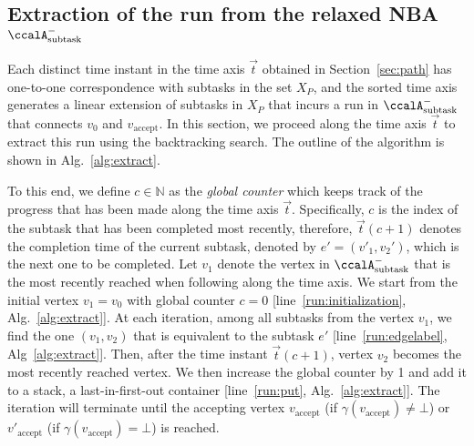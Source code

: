 \documentclass[Afour,sageh,times]{sagej}
\newcommand{\auto}[1]{\ccalA_{\text{#1}}}
\begin{document}
{\subsection{Extraction of the run from the relaxed NBA \upshape $\auto{subtask}^-$}\label{sec:run}

Each distinct time instant in the time axis $\vec{t}$ obtained in Section~\ref{sec:path} has one-to-one correspondence with subtasks in the set $X_P$, and the sorted time axis generates a linear extension of subtasks in $X_P$ that incurs a run in $\auto{subtask}^-$ that connects $v_{0}$ and $v_{\text{accept}}$. In this section, we proceed along the time axis $\vec{t}$ to extract this run using the backtracking search. The outline of the algorithm is shown in Alg.~\ref{alg:extract}.

  To this end, we define $c\in \mathbb{N}$ as the {\it global counter} which keeps track of the progress that has been made along the time axis $\vec{t}$. Specifically, $c$ is the index of the subtask that  has  been completed most recently, therefore, $\vec{t}(c+1)$ denotes  the  completion time of the current subtask, denoted by $e' = (v'_1, v_2')$, which is  the next one to be completed. Let $v_1$ denote the vertex in $\auto{subtask}^-$ that is the  most recently reached when following along the time axis.  We start from the initial vertex $v_1= v_0$ with global counter $c=0$ [line~\ref{run:initialization}, Alg.~\ref{alg:extract}]. At each iteration, among all subtasks from the vertex $v_1$, we find the one $(v_1, v_2)$ that is  equivalent to the  subtask $e'$ [line~\ref{run:edgelabel}, Alg~\ref{alg:extract}]. Then, after the time instant $\vec{t}(c+1)$,  vertex $v_2$ becomes the most recently reached vertex. We then increase the global counter by 1 and add it to a stack, a last-in-first-out container [line~\ref{run:put}, Alg.~\ref{alg:extract}]. The iteration will terminate until the accepting vertex $v_{\text{accept}}$ (if $\gamma(v_{\text{accept}}) \neq \bot$) or $v'_{\text{accept}}$ (if $\gamma(v_{\text{accept}}) = \bot$) is reached.


}
\end{document}
